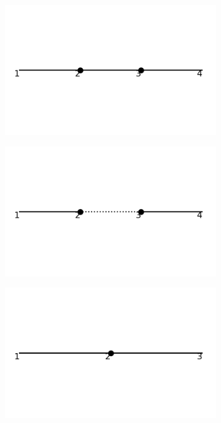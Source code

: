 \documentclass[11pt,a4paper,twoside,pdf]{article}
\numberwithin{equation}{section}
\begin{document}
\begin{figure}[h!]
\begin{subfigure}[t]{0.19\textwidth}
    \end{subfigure}
    \begin{subfigure}[t]{0.19\textwidth}
        \centering
        \includegraphics[width=\textwidth]{plots/order4_1to1/counterterms/4.png}
        \caption{ }
        
    \end{subfigure}
    \begin{subfigure}[t]{0.19\textwidth}
        \centering
        \includegraphics[width=\textwidth]{plots/order4_1to1/counterterms/5.png}
        \caption{ }
        
    \end{subfigure}
    \begin{subfigure}[t]{0.19\textwidth}
        \centering
        \includegraphics[width=\textwidth]{plots/order4_1to1/counterterms/6.png}
        \caption{ }
        

\end{subfigure}
\end{figure}
\end{document}

